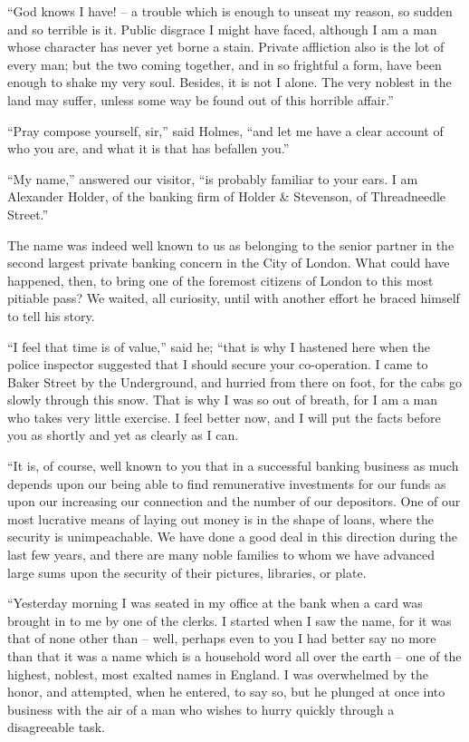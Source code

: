 “God knows I have! -- a trouble which is enough to unseat
my reason, so sudden and so terrible is it. Public disgrace I
might have faced, although I am a man whose character has
never yet borne a stain. Private affliction also is the lot of
every man; but the two coming together, and in so frightful a
form, have been enough to shake my very soul. Besides, it
is not I alone. The very noblest in the land may suffer, unless
some way be found out of this horrible affair.”

“Pray compose yourself, sir,” said Holmes, “and let me
have a clear account of who you are, and what it is that has
befallen you.”

“My name,” answered our visitor, “is probably familiar to
your ears. I am Alexander Holder, of the banking firm of
Holder \& Stevenson, of Threadneedle Street.”

The name was indeed well known to us as belonging to the
senior partner in the second largest private banking concern
in the City of London. What could have happened, then, to
bring one of the foremost citizens of London to this most
pitiable pass? We waited, all curiosity, until with another
effort he braced himself to tell his story.

“I feel that time is of value,” said he; “that is why I hastened
here when the police inspector suggested that I should secure
your co-operation. I came to Baker Street by the Underground,
and hurried from there on foot, for the cabs go slowly
through this snow. That is why I was so out of breath, for
I am a man who takes very little exercise. I feel better now,
and I will put the facts before you as shortly and yet as clearly
as I can.

“It is, of course, well known to you that in a successful
banking business as much depends upon our being able to
find remunerative investments for our funds as upon our increasing
our connection and the number of our depositors.
One of our most lucrative means of laying out money is in
the shape of loans, where the security is unimpeachable. We
have done a good deal in this direction during the last few
years, and there are many noble families to whom we have
advanced large sums upon the security of their pictures, libraries,
or plate.

“Yesterday morning I was seated in my office at the bank
when a card was brought in to me by one of the clerks. I
started when I saw the name, for it was that of none other
than -- well, perhaps even to you I had better say no more
than that it was a name which is a household word all over
the earth -- one of the highest, noblest, most exalted names in
England. I was overwhelmed by the honor, and attempted,
when he entered, to say so, but he plunged at once into business
with the air of a man who wishes to hurry quickly through
a disagreeable task.

